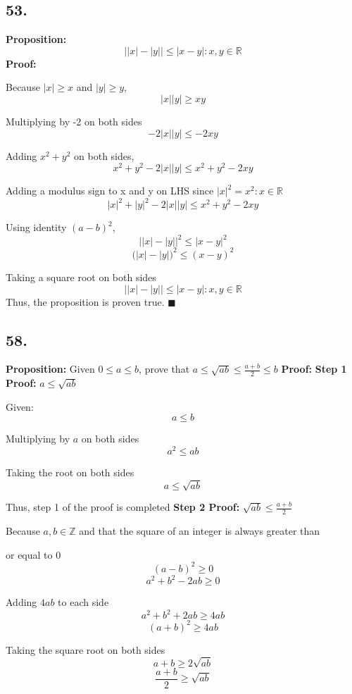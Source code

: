 \documentclass[12pt, a4paper]{article}
\newcommand{\qed}[0]{$\blacksquare$}
\begin{document}
\subsection*{53.}\bigbreak
\textbf{Proposition: }\[ \bigl\lvert\lvert x\rvert -\lvert y\rvert \bigr\rvert \leq \lvert x - y\rvert : x,y \in \mathbb{R}\]
\bigbreak
\noindent\textbf{Proof: }

Because $|x| \geq x$ and $|y| \geq y$,
\[
|x||y| \geq xy
\]

Multiplying by -2 on both sides
\[
-2|x||y| \leq -2xy
\]

Adding $x^2 + y^2$ on both sides,
\[
x^2 + y^2 - 2|x||y| \leq x^2 + y^2 - 2xy
\]

Adding a modulus sign to x and y on LHS since $|x|^2 = x^2: x\in \mathbb{R}$
\[
|x|^2 + |y|^2 - 2|x||y| \leq x^2 + y^2 - 2xy
\]

Using identity $(a-b)^2$,
\[
\bigl\lvert\lvert x\rvert -\lvert y\rvert \bigr\rvert^2 \leq \lvert x - y\rvert^2
\]
\[
    (\lvert x\rvert -\lvert y\rvert \bigr)^2 \leq ( x - y)^2
\]

Taking a square root on both sides
\[ \bigl\lvert\lvert x\rvert -\lvert y\rvert \bigr\rvert \leq \lvert x - y\rvert : x,y \in \mathbb{R}\]
Thus, the proposition is proven true.
\qed
\bigbreak
\bigbreak
\subsection*{58.}
\bigbreak
\textbf{Proposition: } Given $0\leq a \leq b$, prove that $a \leq \sqrt{ab} \leq \frac{a+b}{2} \leq b$
\bigbreak
\noindent\textbf{Proof:}
\bigbreak
\textbf{Step 1 Proof:} $a \leq \sqrt{ab}$
\bigbreak

Given:
\[
a\leq b
\]

Multiplying by $a$ on both sides
\[
a^2 \leq ab
\]

Taking the root on both sides
\[
a \leq \sqrt{ab}
\]

Thus, step 1 of the proof is completed
\bigbreak
\textbf{Step 2 Proof:} $\sqrt{ab} \leq \frac{a+b}{2}$
\bigbreak

Because $a,b \in \mathbb{Z}$ and that the square of an integer is always greater than 

or equal to 0
\[
(a-b)^2 \geq 0 
\]
\[
a^2 + b^2 - 2ab \geq 0
\]

Adding $4ab$ to each side
\[
a^2 + b^2 + 2ab \geq 4ab
\]
\[
(a+b)^2 \geq 4ab
\]

Taking the square root on both sides
\[
a+b \geq 2\sqrt{ab}
\]
\[
\frac{a+b}{2} \geq \sqrt{ab}
\]
\end{document}
